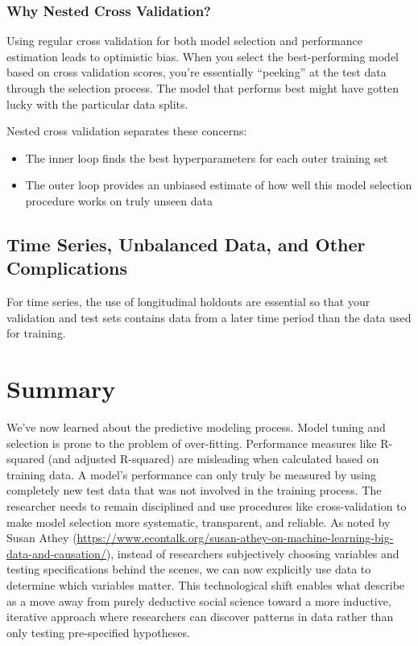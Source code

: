 \subsubsection{Why Nested Cross Validation?}

Using regular cross validation for both model selection and performance estimation leads to optimistic bias. When you select the best-performing model based on cross validation scores, you're essentially ``peeking'' at the test data through the selection process. The model that performs best might have gotten lucky with the particular data splits.

Nested cross validation separates these concerns:
\begin{itemize}
\item The inner loop finds the best hyperparameters for each outer training set
\item The outer loop provides an unbiased estimate of how well this model selection procedure works on truly unseen data
\end{itemize}

\subsection{Time Series, Unbalanced Data, and Other Complications}

For time series, the use of longitudinal holdouts are essential so that your validation and test sets contains data from a later time period than the data used for training.

\section{Summary}

We've now learned about the predictive modeling process. Model tuning and selection is prone to the problem of over-fitting. Performance measures like R-squared (and adjusted R-squared) are misleading when calculated based on training data. A model's performance can only truly be measured by using completely new test data that was not involved in the training process. The researcher needs to remain disciplined and use procedures like cross-validation to make model selection more systematic, transparent, and reliable. As noted by Susan Athey (\url{https://www.econtalk.org/susan-athey-on-machine-learning-big-data-and-causation/}), instead of researchers subjectively choosing variables and testing specifications behind the scenes, we can now explicitly use data to determine which variables matter. This technological shift enables what \cite{grimmer2021machine} describe as a move away from purely deductive social science toward a more inductive, iterative approach where researchers can discover patterns in data rather than only testing pre-specified hypotheses.

